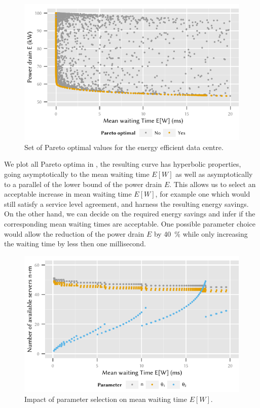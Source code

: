 \begin{figure}
  \centering
  \includegraphics{cloud/data_centers/performance_evaluation/figures/energy_vs_waiting_pareto}
  \caption{Set of Pareto optimal values for the energy efficient data centre.}
  \label{fig:cloud:data_centers:performance_evaluation:energy_vs_waiting_pareto}
\end{figure}

We plot all Pareto optima in , the resulting curve has hyperbolic properties, going asymptotically to the mean waiting time \(E[W]\) as well as asymptotically to a parallel of the lower bound of the power drain \(E\).
This allows us to select an acceptable increase in mean waiting time \(E[W]\), for example one which would still satisfy a service level agreement, and harness the resulting energy savings.
On the other hand, we can decide on the required energy savings and infer if the corresponding mean waiting times are acceptable.
One possible parameter choice would allow the reduction of the power drain \(E\) by \SI{40}{\percent} while only increasing the waiting time by less then one millisecond.

\begin{figure}
  \centering
  \includegraphics{cloud/data_centers/performance_evaluation/figures/sorted_results}
  \caption{Impact of parameter selection on mean waiting time \(E[W]\).}
  \label{fig:cloud:data_centers:performance_evaluation:sorted_results}
\end{figure}

